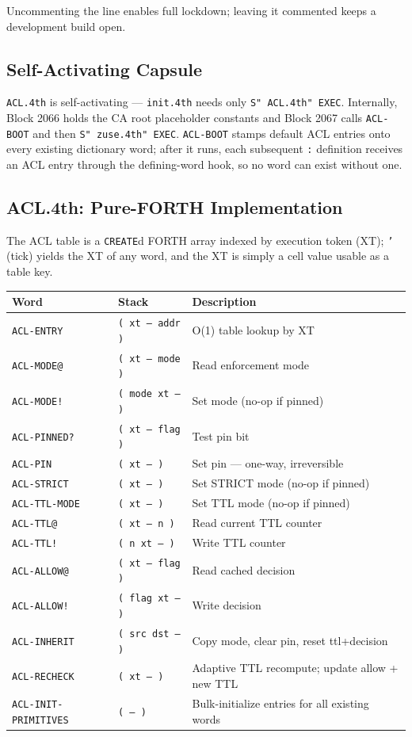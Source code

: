 Uncommenting the line enables full lockdown; leaving it commented keeps a
development build open.

\subsection{Self-Activating Capsule}

\texttt{ACL.4th} is self-activating --- \texttt{init.4th} needs only
\texttt{S" ACL.4th" EXEC}. Internally, Block 2066 holds the CA root placeholder
constants and Block 2067 calls \texttt{ACL-BOOT} and then
\texttt{S" zuse.4th" EXEC}. \texttt{ACL-BOOT} stamps default ACL entries onto
every existing dictionary word; after it runs, each subsequent \texttt{:}
definition receives an ACL entry through the defining-word hook, so no word can
exist without one.

\subsection{ACL.4th: Pure-FORTH Implementation}

The ACL table is a \texttt{CREATE}d FORTH array indexed by execution token
(XT); \texttt{'} (tick) yields the XT of any word, and the XT is simply a cell
value usable as a table key.

\begin{tabular}{lll}
\toprule
Word & Stack & Description \\
\midrule
\texttt{ACL-ENTRY} & \texttt{( xt -- addr )} & O(1) table lookup by XT \\
\texttt{ACL-MODE@} & \texttt{( xt -- mode )} & Read enforcement mode \\
\texttt{ACL-MODE!} & \texttt{( mode xt -- )} & Set mode (no-op if pinned) \\
\texttt{ACL-PINNED?} & \texttt{( xt -- flag )} & Test pin bit \\
\texttt{ACL-PIN} & \texttt{( xt -- )} & Set pin --- one-way, irreversible \\
\texttt{ACL-STRICT} & \texttt{( xt -- )} & Set STRICT mode (no-op if pinned) \\
\texttt{ACL-TTL-MODE} & \texttt{( xt -- )} & Set TTL mode (no-op if pinned) \\
\texttt{ACL-TTL@} & \texttt{( xt -- n )} & Read current TTL counter \\
\texttt{ACL-TTL!} & \texttt{( n xt -- )} & Write TTL counter \\
\texttt{ACL-ALLOW@} & \texttt{( xt -- flag )} & Read cached decision \\
\texttt{ACL-ALLOW!} & \texttt{( flag xt -- )} & Write decision \\
\texttt{ACL-INHERIT} & \texttt{( src dst -- )} & Copy mode, clear pin, reset ttl+decision \\
\texttt{ACL-RECHECK} & \texttt{( xt -- )} & Adaptive TTL recompute; update allow + new TTL \\
\texttt{ACL-INIT-PRIMITIVES} & \texttt{( -- )} & Bulk-initialize entries for all existing words \\
\bottomrule
\end{tabular}

